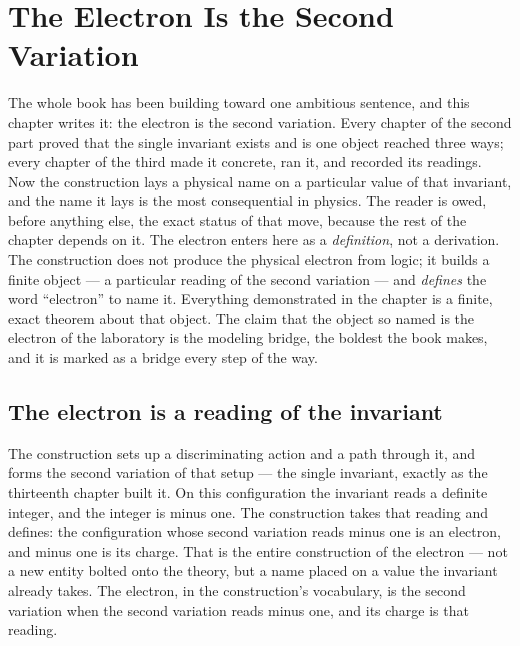 \chapter{The Electron Is the Second Variation}
\label{chap:electron-second-variation}

The whole book has been building toward one ambitious sentence, and this chapter writes it: the
electron is the second variation. Every chapter of the second part proved that the single invariant
exists and is one object reached three ways; every chapter of the third made it concrete, ran it, and
recorded its readings. Now the construction lays a physical name on a particular value of that
invariant, and the name it lays is the most consequential in physics. The reader is owed, before
anything else, the exact status of that move, because the rest of the chapter depends on it. The
electron enters here as a \emph{definition}, not a derivation. The construction does not produce the
physical electron from logic; it builds a finite object --- a particular reading of the second
variation --- and \emph{defines} the word ``electron'' to name it. Everything demonstrated in the
chapter is a finite, exact theorem about that object. The claim that the object so named is the
electron of the laboratory is the modeling bridge, the boldest the book makes, and it is marked as a
bridge every step of the way.

\section{The electron is a reading of the invariant}
\label{se:the-electron-is-a-reading}

The construction sets up a discriminating action and a path through it, and forms the second variation
of that setup --- the single invariant, exactly as the thirteenth chapter built it. On this
configuration the invariant reads a definite integer, and the integer is minus one. The construction
takes that reading and defines: the configuration whose second variation reads minus one is an
electron, and minus one is its charge. That is the entire construction of the electron --- not a new
entity bolted onto the theory, but a name placed on a value the invariant already takes. The electron,
in the construction's vocabulary, is the second variation when the second variation reads minus one,
and its charge is that reading.

